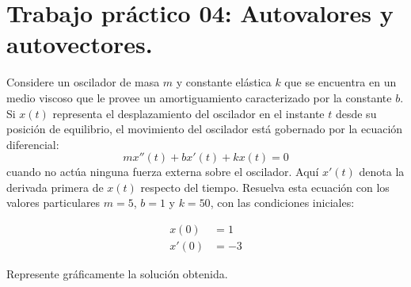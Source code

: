 \documentclass[11pt]{article}
\begin{document}
\section{Trabajo práctico 04: Autovalores y autovectores.}
Considere un oscilador de masa $m$ y constante elástica $k$ que se encuentra en un medio viscoso que le provee un amortiguamiento caracterizado por la constante $b$. Si $x(t)$ representa el desplazamiento del oscilador en el instante $t$ desde su posición de equilibrio, el movimiento del oscilador está gobernado por la ecuación diferencial:
\begin{equation}
    m x''(t) + b x'(t) + k x(t) = 0
\end{equation}
cuando no actúa ninguna fuerza externa sobre el oscilador. Aquí $x'(t)$ denota la derivada primera de $x(t)$ respecto del tiempo. Resuelva esta ecuación con los valores particulares $m = 5$, $b = 1$ y $k = 50$, con las condiciones iniciales:

\begin{equation}
\begin{aligned}
    x(0) &= 1 \\
    x'(0) &= -3
\end{aligned}
\end{equation}

Represente gráficamente la solución obtenida.
\end{document}
